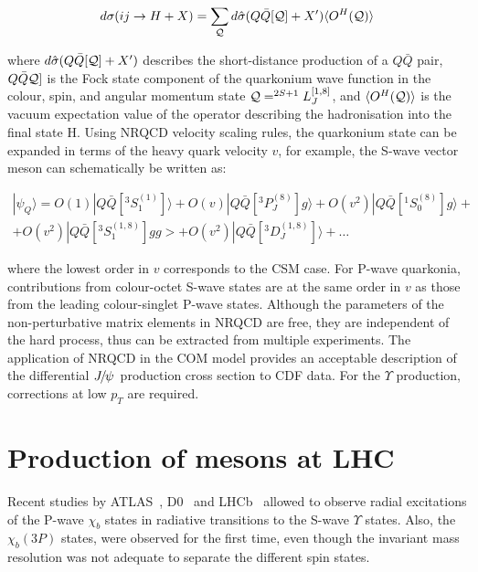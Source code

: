 \begin{equation}
d\sigma ( i j \rightarrow H + X ) = \sum_{\cal{Q}} d{\hat{\sigma}}(Q{\bar{Q}}[{\cal{Q}}] + X') 
\langle O^H({\cal{Q}})\rangle
\end{equation}

\noindent where $d{\hat{\sigma}}(Q{\bar{Q}}[{\cal{Q}}] + X')$ describes the
short-distance production of a  $Q{\bar{Q}}$ pair, $Q{\bar{Q}}{\cal{Q}}]$ is
the Fock state component of the quarkonium wave function in the colour, spin,
and angular momentum state ${\cal{Q}} =^{2S+1} L_J^{[1,8]}$, and
$\langle O^H({\cal{Q}})\rangle$ is the vacuum expectation value of the operator describing
the hadronisation into the final state H. Using NRQCD velocity scaling rules,
the quarkonium state can be expanded in terms of the heavy quark velocity $v$,
for example, the S-wave vector meson can schematically be written as:

\begin{equation}
\begin{split}
|\psi_Q\rangle = O(1)|Q{\bar{Q}}[^3S_1^{(1)}]   \rangle + O(v)|Q{\bar{Q}}[^3P_J^{(8)}] g\rangle + O(v^2)|Q{\bar{Q}}[^1S_0^{(8)}]    g\rangle + \\
+ O(v^2)|Q{\bar{Q}}[^3S_1^{(1,8)}]  gg> + O(v^2)|Q{\bar{Q}}[^3D_J^{(1,8)}]\rangle + \ldots
\end{split}
\end{equation}   

\noindent where the lowest order in $v$ corresponds to the CSM case. For P-wave
quarkonia, contributions from colour-octet S-wave states are at the same order
in $v$ as those from the leading colour-singlet P-wave states. Although the
parameters of the non-perturbative matrix elements in NRQCD are free, they are
independent of the hard process, thus can be extracted from multiple
experiments. The application of NRQCD in the COM model provides an acceptable
description of the differential ${{J\mskip -3mu/\mskip -2mu\psi\mskip 2mu}}$ production cross section to CDF data.
For the $\Upsilon$ production, corrections at low $p_T$ are required.

\section{Production of \chib mesons at LHC}

Recent studies by ATLAS~\cite{Aad:2011ih}, D0~\cite{Abazov:2012gh} and
LHCb~\cite{LHCb-CONF-2012-020} allowed to
observe radial excitations of the P-wave $\chi_b$ states in radiative
transitions to the S-wave $\Upsilon$ states. Also, the $\chi_b(3P)$ states,
were observed for the first time, even though the invariant mass resolution was
not adequate to separate the different spin states.

